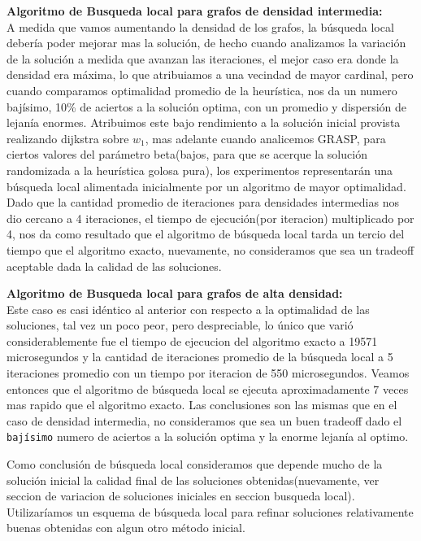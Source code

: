 \textbf{Algoritmo de Busqueda local para grafos de densidad intermedia:}\\
A medida que vamos aumentando la densidad de los grafos, la b\'usqueda local deber\'ia poder mejorar mas la soluci\'on, de hecho cuando analizamos la variaci\'on de la soluci\'on a medida que avanzan las iteraciones, el mejor caso era donde la densidad era m\'axima, lo que atribuiamos a una vecindad de mayor cardinal, pero cuando comparamos optimalidad promedio de la heur\'istica, nos da un numero baj\'isimo, 10\% de aciertos a la soluci\'on optima, con un promedio y dispersi\'on de lejan\'ia enormes. Atribuimos este bajo rendimiento a la soluci\'on inicial provista realizando dijkstra sobre $w_1$, mas adelante cuando analicemos GRASP, para ciertos valores del par\'ametro beta(bajos, para que se acerque la soluci\'on randomizada a la heur\'istica golosa pura), los experimentos representar\'an una b\'usqueda local alimentada inicialmente por un algoritmo de mayor optimalidad. Dado que la cantidad promedio de iteraciones para densidades intermedias nos dio cercano a 4 iteraciones, el tiempo de ejecuci\'on(por iteracion) multiplicado por 4, nos da como resultado que el algoritmo de b\'usqueda local tarda un tercio del tiempo que el algoritmo exacto, nuevamente, no consideramos que sea un tradeoff aceptable dada la calidad de las soluciones.

\vspace{0.5cm}

\textbf{Algoritmo de Busqueda local para grafos de alta densidad:}\\
Este caso es casi id\'entico al anterior con respecto a la optimalidad de las soluciones, tal vez un poco peor, pero despreciable, lo \'unico que vari\'o considerablemente fue el tiempo de ejecucion del algoritmo exacto a 19571 microsegundos y la cantidad de iteraciones promedio de la b\'usqueda local a 5 iteraciones promedio con un tiempo por iteracion de 550 microsegundos. Veamos entonces que el algoritmo de b\'usqueda local se ejecuta aproximadamente 7 veces mas rapido que el algoritmo exacto. Las conclusiones son las mismas que en el caso de densidad intermedia, no consideramos que sea un buen tradeoff dado el \texttt{baj\'isimo} numero de aciertos a la soluci\'on optima y la enorme lejan\'ia al optimo.

\vspace{0.5cm}

Como conclusi\'on de b\'usqueda local consideramos que depende mucho de la soluci\'on inicial la calidad final de las soluciones obtenidas(nuevamente, ver seccion de variacion de soluciones iniciales en seccion busqueda local). Utilizar\'iamos un esquema de b\'usqueda local para refinar soluciones relativamente buenas obtenidas con algun otro m\'etodo inicial.

